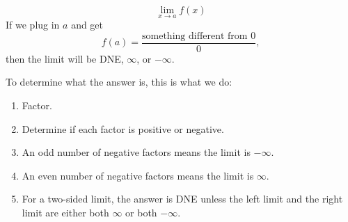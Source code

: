 \begin{frame}
\[
\lim_{x\to a}f(x)
\]
If we plug in $a$ and get
\[
f(a) = \frac{\text{something different from $0$}}{0},
\]
then the limit will be DNE, $\infty$, or $-\infty$.

To determine what the answer is, this is what we do:
\begin{enumerate}
\item  Factor.
\item  Determine if each factor is positive or negative.
\item  An odd number of negative factors means the limit is $-\infty$.
\item  An even number of negative factors means the limit is $\infty$.
\item  For a two-sided limit, the answer is DNE unless the left limit and the right limit are either both $\infty$ or both $-\infty$.
\end{enumerate}
\end{frame}
